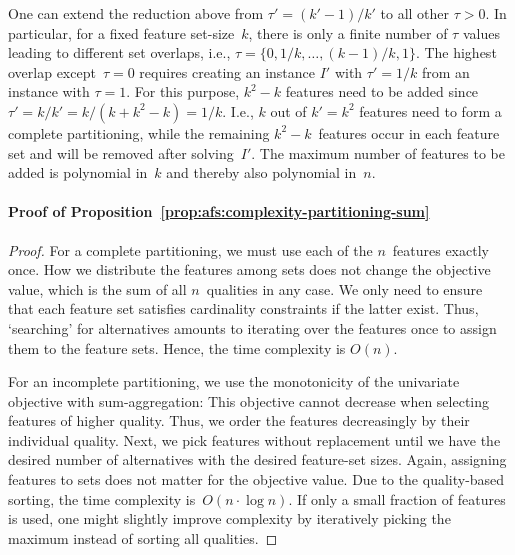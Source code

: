 \documentclass[iicol, sn-basic, Numbered]{sn-jnl} %
\theoremstyle{plain}
\theoremstyle{definition}
\begin{document}
\begin{appendices}
One can extend the reduction above from $\tau' = (k' - 1) / k'$ to all other $\tau > 0$.
In particular, for a fixed feature set-size~$k$, there is only a finite number of $\tau$ values leading to different set overlaps, i.e., $\tau = \{0, 1/k, \dots, (k - 1) / k, 1\}$.
The highest overlap except~$\tau=0$ requires creating an instance $I'$ with $\tau'= 1/k$ from an instance with $\tau = 1$.
For this purpose, $k^2 - k$ features need to be added since $\tau' = k / k' = k / (k + k^2 -k) = 1/k$.
I.e., $k$ out of $k' = k^2$ features need to form a complete partitioning, while the remaining $k^2 - k$~features occur in each feature set and will be removed after solving~$I'$.
The maximum number of features to be added is polynomial in~$k$ and thereby also polynomial in~$n$.

\paragraph{Proof of Proposition~\ref{prop:afs:complexity-partitioning-sum}}
%
\begin{proof}
	For a complete partitioning, we must use each of the $n$~features exactly once.
	How we distribute the features among sets does not change the objective value, which is the sum of all $n$~qualities in any case.
	We only need to ensure that each feature set satisfies cardinality constraints if the latter exist.
	Thus, `searching' for alternatives amounts to iterating over the features once to assign them to the feature sets.
	Hence, the time complexity is $O(n)$.

	For an incomplete partitioning, we use the monotonicity of the univariate objective with sum-aggregation:
	This objective cannot decrease when selecting features of higher quality.
	Thus, we order the features decreasingly by their individual quality.
	Next, we pick features without replacement until we have the desired number of alternatives with the desired feature-set sizes.
	Again, assigning features to sets does not matter for the objective value.
	Due to the quality-based sorting, the time complexity is~$O(n \cdot \log n)$.
	If only a small fraction of features is used, one might slightly improve complexity by iteratively picking the maximum instead of sorting all qualities.
\end{proof}

\end{appendices}


\end{document}
